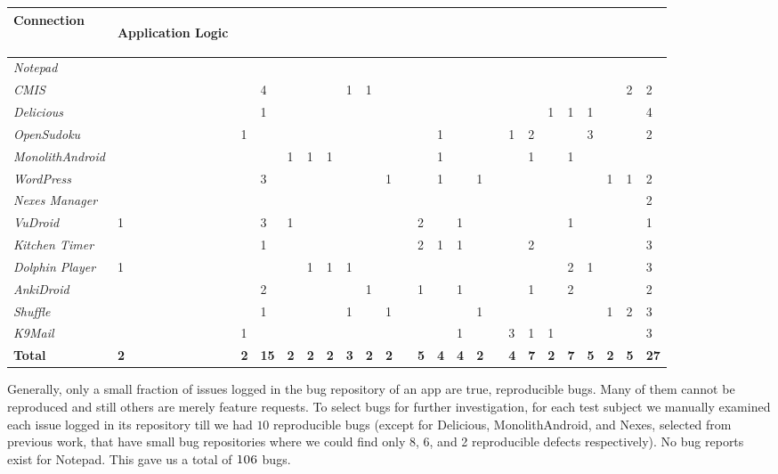 \begin{table*}[t!]
\begin{tabular}{llllllllllllllllllllllll}
Connection}\end{sideways}&\begin{sideways}\textbf{Application Logic}\end{sideways}\\
\midrule
\textit{Notepad}&&&&&&&&&&&&&&&&&&&&&&&\\
\textit{CMIS}&&&4&&&&1&1&&&&&&&&&&&&&&2&2\\
\textit{Delicious}&&&1&&&&&&&&&&&&&&&1&1&1&&&4\\
\textit{OpenSudoku}&&1&&&&&&&&&&1&&&&1&2&&&3&&&2\\
\textit{MonolithAndroid}&&&&1&1&1&&&&&&1&&&&&1&&1&&&&\\
\textit{WordPress}&&&3&&&&&&1&&&1&&1&&&&&&&1&1&2\\
\textit{Nexes Manager}&&&&&&&&&&&&&&&&&&&&&&&2\\
\midrule
\textit{VuDroid}&1&&3&1&&&&&&&2&&1&&&&&&1&&&&1\\
\textit{Kitchen Timer}&&&1&&&&&&&&2&1&1&&&&2&&&&&&3\\
\textit{Dolphin Player}&1&&&&1&1&1&&&&&&&&&&&&2&1&&&3\\
\textit{AnkiDroid}&&&2&&&&&1&&&1&&1&&&&1&&2&&&&2\\
\textit{Shuffle}&&&1&&&&1&&1&&&&&1&&&&&&&1&2&3\\
\textit{K9Mail}&&1&&&&&&&&&&&1&&&3&1&1&&&&&3\\
\midrule
\textbf{Total}& \textbf{2} & \textbf{2} & \textbf{15} & \textbf{2} & \textbf{2} & \textbf{2} & \textbf{3} & \textbf{2} & \textbf{2} && \textbf{5} & \textbf{4} & \textbf{4} & \textbf{2} && \textbf{4} & \textbf{7} & \textbf{2} & \textbf{7} & \textbf{5} & \textbf{2} & \textbf{5} & \textbf{27} \\
\bottomrule
\end{tabular}
\vspace*{-4ex}
\end{table*}

Generally, only a small fraction of issues logged in the bug repository of an app are true, reproducible bugs. Many of them cannot be reproduced and
still others are merely feature requests. To select bugs for further investigation, for each test subject we manually examined each issue logged in
its repository till we had $10$ reproducible bugs (except for Delicious, MonolithAndroid, and Nexes, selected from previous work, that have small bug repositories where we could find only 8, 6, and 2 reproducible defects respectively). No bug reports exist for Notepad. This gave us a total of $\textsc{106}$ bugs.

